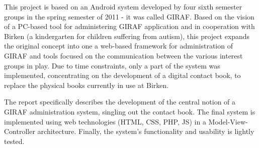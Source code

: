 This project is based on an Android system developed by four sixth semester groups in the spring semester of 2011 - it was called GIRAF. Based on the vision of a PC-based tool for administering GIRAF application and in cooperation with Birken (a kindergarten for children suffering from autism), this project expands the original concept into one a web-based framework for administration of GIRAF and tools focused on the communication between the various interest groups in play. Due to time constraints, only a part of the system was implemented, concentrating on the development of a digital contact book, to replace the physical books currently in use at Birken.


The report specifically describes the development of the central notion of a GIRAF administration system, singling out the contact book. The final system is implemented using web technologies (HTML, CSS, PHP, JS) in a Model-View-Controller architecture. Finally, the system's functionality and usability is lightly tested.

